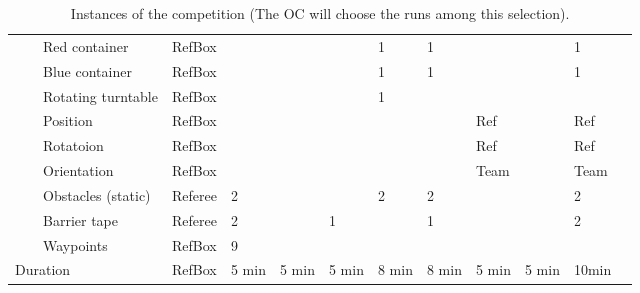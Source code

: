 \begin{landscape}
\begin{table}[h!]
\begin{tabular}{|l|l|l|l*{9}{|P{1cm}}|}
      &  & Red container       & RefBox &       &       &       &   1   &   1   &       &   & 1   \\ \hhline{~~----------}
      &  & Blue container      & RefBox &       &       &       &   1   &   1   &       &   & 1   \\ \hhline{~~----------}
      &  & Rotating turntable  & RefBox &       &       &       &   1   &      &       &   &    \\ 
      \hhline{------------} \hhline{------------}
      & 
         & Position     & RefBox &       &       &       &      &      &   Ref	  &   &  Ref   \\ \hhline{~~----------}
      &  & Rotatoion	& RefBox &       &       &       &      &      &   Ref    &   &  Ref   \\ \hhline{~~----------}
      &  & Orientation	& RefBox &       &       &       &      &      &   Team   &   &  Team  \\ 
    \hhline{~-----------} \hhline{~-----------}
     & 
     &     Obstacles (static) & Referee &  2    &       &       &   2   &   2   &       &   & 2   \\ \hhline{~~----------}
     &   & Barrier tape       & Referee &  2    &       &   1   &       &    1    &       &   & 2   \\ \hhline{~~----------}
     &   & Waypoints          & RefBox  &  9    &       &       &       &       &       &   &    \\ 
		\hline \hline
		 \multicolumn{3}{|l|}{Duration} 
		                    & RefBox & 5 min   & 5 min & 5 min  &   8 min &   8 min & 5 min & 5 min & 10min \\
		\hline
 \end{tabular}
 \caption{Instances of the \RCAW \YEAR competition (The OC will choose the runs among this selection).}
 \label{tab:Instances}
\end{table}
\end{landscape}


